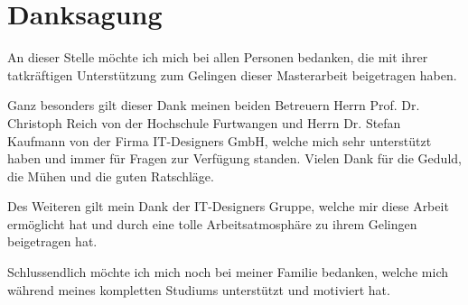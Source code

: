 
\chapter*{Danksagung} %

An dieser Stelle möchte ich mich bei allen Personen bedanken, die mit ihrer tatkräftigen Unterstützung zum
Gelingen dieser Masterarbeit beigetragen haben.

Ganz besonders gilt dieser Dank meinen beiden Betreuern Herrn Prof. Dr. Christoph Reich von
der Hochschule Furtwangen und Herrn Dr. Stefan Kaufmann von der Firma IT-Designers GmbH, welche
mich sehr unterstützt haben und immer für Fragen zur Verfügung standen.
Vielen Dank für die Geduld, die Mühen und die guten Ratschläge.

Des Weiteren gilt mein Dank der IT-Designers Gruppe, welche mir diese Arbeit ermöglicht hat und durch eine
tolle Arbeitsatmosphäre zu ihrem Gelingen beigetragen hat.


Schlussendlich möchte ich mich noch bei meiner Familie bedanken, welche mich während meines
kompletten Studiums unterstützt und motiviert hat.  